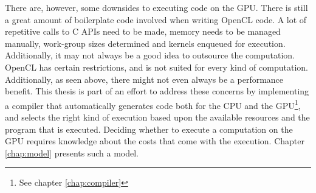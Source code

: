 There are, however, some downsides to executing code on the GPU. There is still a great amount of boilerplate code involved when writing OpenCL code. A lot of repetitive calls to C APIs need to be made, memory needs to be managed manually, work-group sizes determined and kernels enqueued for execution. Additionally, it may not always be a good idea to outsource the computation. OpenCL has certain restrictions, and is not suited for every kind of computation. Additionally, as seen above, there might not even always be a performance benefit. This thesis is part of an effort to address these concerns by implementing a compiler that automatically generates code both for the CPU and the GPU\footnote{See chapter \ref{chap:compiler}}, and selects the right kind of execution based upon the available resources and the program that is executed. Deciding whether to execute a computation on the GPU requires knowledge about the costs that come with the execution. Chapter \ref{chap:model} presents such a model. 